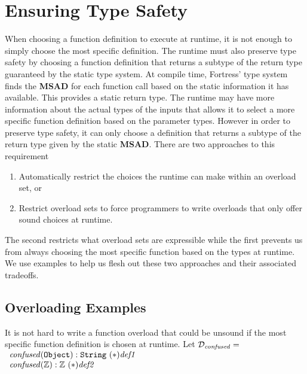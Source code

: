 \documentclass[preprint]{sigplanconf}
\begin{document}
\section{Ensuring Type Safety}

When choosing a function definition to execute at runtime, it is not enough to simply choose the most
specific definition.  The runtime must also preserve type safety by choosing a function definition that
returns a subtype of the return type guaranteed by the static type system.
At compile time, Fortress' type system finds the {\bf MSAD} for each function call based on the
static information it has available.  This provides a static return type.  The runtime may have more information
about the actual types of the inputs that allows it to select a more specific function definition based on the 
parameter types.  However in order to preserve type safety, it
can only choose a definition that returns a subtype of the return type given by the static {\bf MSAD}.  There
are two approaches to this requirement
\begin{enumerate}
\item Automatically restrict the choices the runtime can make within an overload set, or
\item Restrict overload sets to force programmers to write overloads that only offer sound choices at runtime.
\end{enumerate}
The second restricts what overload sets are expressible while the first prevents us from always choosing the
most specific function based on the types at runtime.  We use examples to help us
flesh out these two approaches and their associated tradeoffs.

\subsection{Overloading Examples}

It is not hard to write a function overload that could be unsound if the most specific function definition
is chosen at runtime.  Let $\mathcal{D}_{{\it confused}}=$\\

$\begin{array}{l}
{\it confused}({\tt Object}) : {\tt String}~(*){\it def1}\\
{\it confused}(\mathbb{Z}) : \mathbb{Z}~(*){\it def2}\\
\end{array}$\\
\end{document}
